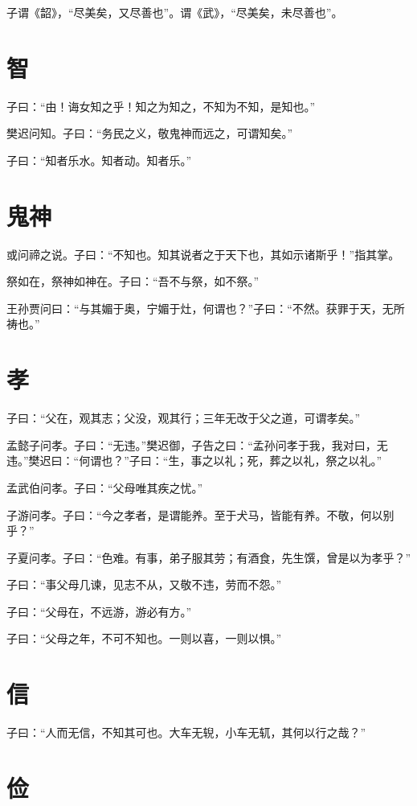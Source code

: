 \documentclass[a5paper]{ctexbook}
\begin{document}
    子谓《韶》，“尽美矣，又尽善也”。谓《武》，“尽美矣，未尽善也”。

    \chapter{智}

    子曰：“由！诲女知之乎！知之为知之，不知为不知，是知也。”

    樊迟问知。子曰：“务民之义，敬鬼神而远之，可谓知矣。”
    
    子曰：“知者乐水。知者动。知者乐。”

    \chapter{鬼神}

    或问禘之说。子曰：“不知也。知其说者之于天下也，其如示诸斯乎！”指其掌。

    祭如在，祭神如神在。子曰：“吾不与祭，如不祭。”

    王孙贾问曰：“与其媚于奥，宁媚于灶，何谓也？”子曰：“不然。获罪于天，无所祷也。”

    \chapter{孝}

    子曰：“父在，观其志；父没，观其行；三年无改于父之道，可谓孝矣。”

    孟懿子问孝。子曰：“无违。”樊迟御，子告之曰：“孟孙问孝于我，我对曰，无违。”樊迟曰：“何谓也？”子曰：“生，事之以礼；死，葬之以礼，祭之以礼。”

    孟武伯问孝。子曰：“父母唯其疾之忧。”

    子游问孝。子曰：“今之孝者，是谓能养。至于犬马，皆能有养。不敬，何以别乎？”

    子夏问孝。子曰：“色难。有事，弟子服其劳；有酒食，先生馔，曾是以为孝乎？”

    子曰：“事父母几谏，见志不从，又敬不违，劳而不怨。”

    子曰：“父母在，不远游，游必有方。”

    子曰：“父母之年，不可不知也。一则以喜，一则以惧。”

    \chapter{信}

    子曰：“人而无信，不知其可也。大车无𫐐，小车无𫐄，其何以行之哉？”

    \chapter{俭}
\end{document}
